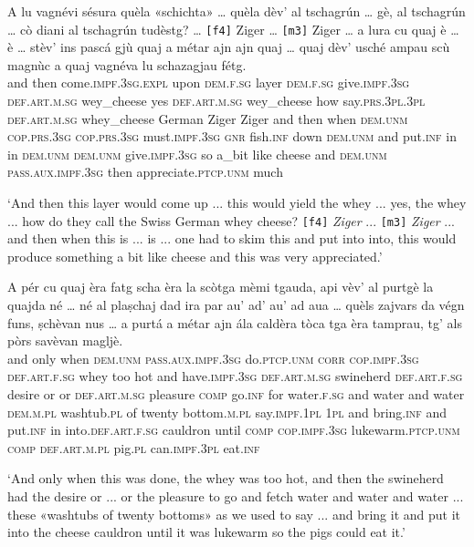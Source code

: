 \begin{linenumbers}
	\gll   A lu vagnévi sésura quèla «schichta»\footnotemark{} … quèla dèv’ al tschagrún … gè, al tschagrún … cò diani al tschagrún tudèstg? … \texttt{[f4]} Ziger … \texttt{[m3]} Ziger …  a lura cu quaj è … è … stèv’ ins pascá gjù quaj a métar ajn ajn quaj … quaj dèv’ usché ampau scù magnùc a quaj vagnéva lu schazagjau fétg.\\
	and then come.\textsc{impf.3sg.expl} upon \textsc{dem.f.sg} layer {} \textsc{dem.f.sg} give.\textsc{impf.3sg} \textsc{def.art.m.sg} wey\_cheese {} yes \textsc{def.art.m.sg} wey\_cheese {} how say.\textsc{prs.3pl.3pl} \textsc{def.art.m.sg} whey\_cheese German {} {} Ziger {} {} Ziger {} and then when \textsc{dem.unm} \textsc{cop.prs.3sg} {} \textsc{cop.prs.3sg} {}  must.\textsc{impf.3sg} \textsc{gnr} fish.\textsc{inf} down \textsc{dem.unm} and put.\textsc{inf} in in \textsc{dem.unm} {} \textsc{dem.unm} give.\textsc{impf.3sg} so a\_bit like cheese and \textsc{dem.unm} \textsc{pass.aux.impf.3sg} then appreciate.\textsc{ptcp.unm} much \\
\end{linenumbers}
\medskip
\glt `And then this layer would come up ... this would yield the whey ... yes, the whey ... how do they call the Swiss German whey cheese? \texttt{[f4]} \textit{Ziger} ... \texttt{[m3]} \textit{Ziger} ... and then when this is ... is ... one had to skim this and put into into, this would produce something a bit like cheese and this was very appreciated.'
\medskip

\begin{linenumbers}
	\gll  A pér cu quaj èra fatg scha èra la scòtga mèmi tgauda, api vèv’ al purtgè  la quajda né … né al plaṣchaj dad ira par au’ ad’ au’ ad aua …  quèls zajvars da végn funs, ṣchèvan nus … a purtá a métar ajn ála caldèra tòca tga èra tamprau, tg’ als pòrs savèvan magljè.  \\
	and only when \textsc{dem.unm} \textsc{pass.aux.impf.3sg} do.\textsc{ptcp.unm} \textsc{corr} \textsc{cop.impf.3sg} \textsc{def.art.f.sg} whey too hot and have.\textsc{impf.3sg} \textsc{def.art.m.sg} swineherd \textsc{def.art.f.sg} desire or {} or \textsc{def.art.m.sg} pleasure \textsc{comp} go.\textsc{inf} for water.\textsc{f.sg} and water and water {} \textsc{dem.m.pl} washtub.\textsc{pl} of twenty bottom.\textsc{m.pl} say.\textsc{impf.1pl} \textsc{1pl} {} and bring.\textsc{inf} and put.\textsc{inf} in into.\textsc{def.art.f.sg} cauldron until \textsc{comp} \textsc{cop.impf.3sg} lukewarm.\textsc{ptcp.unm} \textsc{comp} \textsc{def.art.m.pl} pig.\textsc{pl} can.\textsc{impf.3pl} eat.\textsc{inf}\\
\end{linenumbers}
\medskip
\glt `And only when this was done, the whey was too hot, and then the swineherd had the desire or ... or the pleasure to go and fetch water and water and water ... these «washtubs of twenty bottoms» as we used to say ... and bring it and put it into the cheese cauldron until it was lukewarm so the pigs could eat it.'
\medskip

